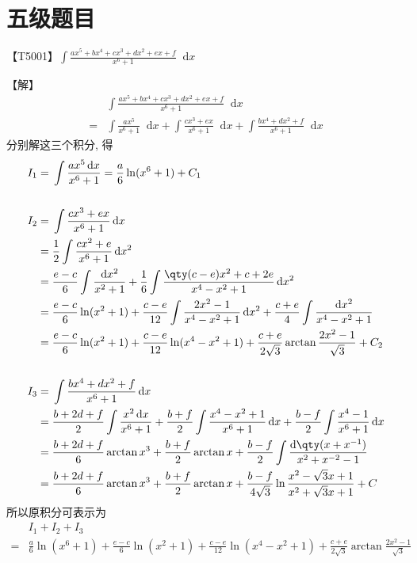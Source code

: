 \documentclass{ctexbook}
\newcommand*{\dif}{\mathop{}\!\mathrm{d}}
\begin{document}
{\chapter*{五级题目}
【T5001】$\int\frac{ax^{5}+bx^{4}+cx^{3}+dx^{2}+ex+f}{x^{6}+1}\dif{x}$\par
【解】
\begin{align*}
{}&\int\frac{ax^{5}+bx^{4}+cx^{3}+dx^{2}+ex+f}{x^{6}+1}\dif{x}\\
={}&\int\frac{ax^{5}}{x^{6}+1}\dif{x}+\int\frac{cx^{3}+ex}{x^{6}+1}\dif{x}+\int\frac{bx^{4}+dx^{2}+f}{x^{6}+1}\dif{x}
\end{align*}
分别解这三个积分, 得
\begin{align*}
I_{1}={}&\int\frac{ax^{5}\dif{x}}{x^{6}+1}=\frac{a}{6}\ln(x^{6}+1)+C_{1}\\
\\
I_{2}={}&\int\frac{cx^{3}+ex}{x^{6}+1}\dif{x}\\
={}&\frac{1}{2}\int\frac{cx^{2}+e}{x^{6}+1}\dif{x^{2}}\\
={}&\frac{e-c}{6}\int\frac{\dif{x^{2}}}{x^{2}+1}+\frac{1}{6}\int\frac{\qty(c-e)x^{2}+c+2e}{x^{4}-x^{2}+1}\dif{x^{2}}\\
={}&\frac{e-c}{6}\ln(x^{2}+1)+\frac{c-e}{12}\int\frac{2x^{2}-1}{x^{4}-x^{2}+1}\dif{x^{2}}+\frac{c+e}{4}\int\frac{\dif{x^{2}}}{x^{4}-x^{2}+1}\\
={}&\frac{e-c}{6}\ln(x^{2}+1)+\frac{c-e}{12}\ln(x^{4}-x^{2}+1)+\frac{c+e}{2\sqrt{3}}\arctan{\frac{2x^{2}-1}{\sqrt{3}}}+C_{2}\\
\\
I_{3}={}&\int\frac{bx^{4}+dx^{2}+f}{x^{6}+1}\dif{x}\\
={}&\frac{b+2d+f}{2}\int\frac{x^{2}\dif{x}}{x^{6}+1}+\frac{b+f}{2}\int\frac{x^{4}-x^{2}+1}{x^{6}+1}\dif{x}+\frac{b-f}{2}\int\frac{x^{4}-1}{x^{6}+1}\dif{x}\\
={}&\frac{b+2d+f}{6}\arctan{x^{3}}+\frac{b+f}{2}\arctan{x}+\frac{b-f}{2}\int\frac{\dif{\qty(x+x^{-1})}}{x^{2}+x^{-2}-1}\\
={}&\frac{b+2d+f}{6}\arctan{x^{3}}+\frac{b+f}{2}\arctan{x}+\frac{b-f}{4\sqrt{3}}\ln{\frac{x^{2}-\sqrt{3}x+1}{x^{2}+\sqrt{3}x+1}}+C
\end{align*}
所以原积分可表示为
\begin{align*}
{}&I_{1}+I_{2}+I_{3}\\
={}&\frac{a}{6}\ln(x^{6}+1)+\frac{e-c}{6}\ln(x^{2}+1)+\frac{c-e}{12}\ln(x^{4}-x^{2}+1)+\frac{c+e}{2\sqrt{3}}\arctan{\frac{2x^{2}-1}{\sqrt{3}}}\\

\end{align*}}
\end{document}
